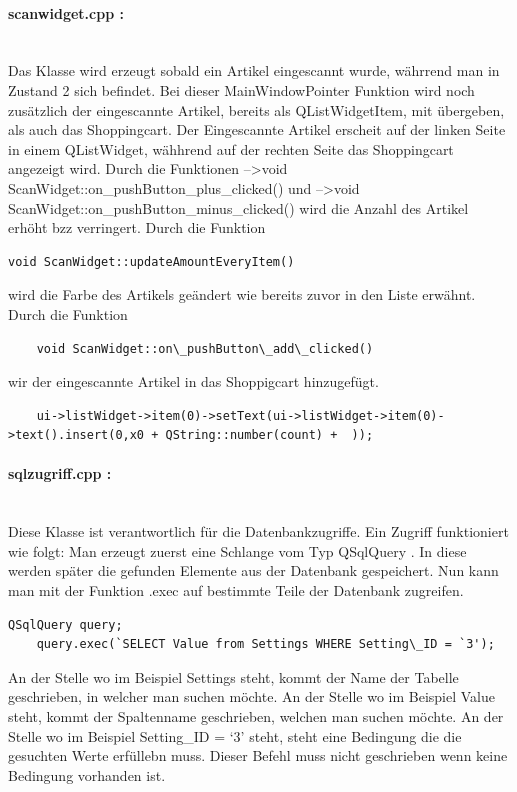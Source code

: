 \documentclass[11pt,a4paper]{article} %
\begin{document}
\paragraph{scanwidget.cpp :} $\;$ \\
	Das Klasse wird erzeugt sobald ein Artikel eingescannt wurde, währrend man in Zustand 2 sich befindet.
	Bei dieser MainWindowPointer Funktion wird noch zusätzlich der eingescannte Artikel, bereits als QListWidgetItem, mit übergeben, als auch das Shoppingcart.
	Der Eingescannte Artikel erscheit auf der linken Seite in einem QListWidget, wähhrend auf der rechten Seite das Shoppingcart angezeigt wird.
	Durch die Funktionen -->void ScanWidget::on\_pushButton\_plus\_clicked() und -->void ScanWidget::on\_pushButton\_minus\_clicked() wird die Anzahl des Artikel erhöht bzz verringert.
	Durch die Funktion 
	\begin{frame}

\begin{lstlisting}
void ScanWidget::updateAmountEveryItem()
\end{lstlisting}
\end{frame}
wird die Farbe des Artikels geändert wie bereits zuvor in den Liste erwähnt.
	Durch die Funktion 
	\begin{frame}

\begin{lstlisting}
	void ScanWidget::on\_pushButton\_add\_clicked()
	\end{lstlisting}
\end{frame}
	  wir der eingescannte Artikel in das Shoppigcart hinzugefügt.
	\begin{frame}

\begin{lstlisting}
	ui->listWidget->item(0)->setText(ui->listWidget->item(0)->text().insert(0,x0 + QString::number(count) +  ));	
	\end{lstlisting}
\end{frame}
\par		
\paragraph{sqlzugriff.cpp :} $\;$ \\
	Diese Klasse ist verantwortlich für die Datenbankzugriffe.
	Ein Zugriff funktioniert wie folgt:
	Man erzeugt zuerst eine Schlange vom Typ QSqlQuery . In diese werden später die gefunden Elemente aus der Datenbank gespeichert. Nun kann man mit der Funktion .exec auf bestimmte Teile der Datenbank zugreifen.
	\begin{frame}

\begin{lstlisting}
QSqlQuery query;
	query.exec(`SELECT Value from Settings WHERE Setting\_ID = `3');
	\end{lstlisting}
\end{frame}
	An der Stelle wo im Beispiel Settings steht, kommt der Name der Tabelle geschrieben, in welcher man suchen möchte.
	An der Stelle wo im Beispiel Value steht, kommt der Spaltenname geschrieben, welchen man suchen möchte.
	An der Stelle wo im Beispiel Setting\_ID = `3' steht, steht eine Bedingung die die gesuchten Werte erfüllebn muss. Dieser Befehl muss nicht geschrieben wenn keine Bedingung vorhanden ist.
	
\end{document}
